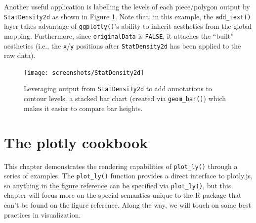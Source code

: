 \documentclass[12pt,]{isuthesis}
\newenvironment{Shaded}{\begin{snugshade}}{\end{snugshade}}
\newcommand{\KeywordTok}[1]{\textcolor[rgb]{0.13,0.29,0.53}{\textbf{{#1}}}}
\newcommand{\DataTypeTok}[1]{\textcolor[rgb]{0.13,0.29,0.53}{{#1}}}
\newcommand{\DecValTok}[1]{\textcolor[rgb]{0.00,0.00,0.81}{{#1}}}
\newcommand{\StringTok}[1]{\textcolor[rgb]{0.31,0.60,0.02}{{#1}}}
\newcommand{\OtherTok}[1]{\textcolor[rgb]{0.56,0.35,0.01}{{#1}}}
\newcommand{\NormalTok}[1]{{#1}}
\begin{document}
Another useful application is labelling the levels of each piece/polygon
output by \texttt{StatDensity2d} as shown in Figure
\ref{fig:StatDensity2d}. Note that, in this example, the
\texttt{add\_text()} layer takes advantage of \texttt{ggplotly()}'s
ability to inherit aesthetics from the global mapping. Furthermore,
since \texttt{originalData} is \texttt{FALSE}, it attaches the ``built''
aesthetics (i.e., the \texttt{x}/\texttt{y} positions after
\texttt{StatDensity2d} has been applied to the raw data).

\begin{Shaded}
\end{Shaded}

\begin{figure}
\centering
\texttt{[image: screenshots/StatDensity2d]}
\caption{\label{fig:StatDensity2d}Leveraging output from
\texttt{StatDensity2d} to add annotations to contour levels. a stacked
bar chart (created via \texttt{geom\_bar()}) which makes it easier to
compare bar heights.}
\end{figure}

\section{The plotly cookbook}\label{the-plotly-cookbook}

This chapter demonstrates the rendering capabilities of
\texttt{plot\_ly()} through a series of examples. The
\texttt{plot\_ly()} function provides a direct interface to plotly.js,
so anything in \href{https://plot.ly/r/reference/}{the figure reference}
can be specified via \texttt{plot\_ly()}, but this chapter will focus
more on the special semantics unique to the R package that can't be
found on the figure reference. Along the way, we will touch on some best
practices in visualization.
\end{document}
